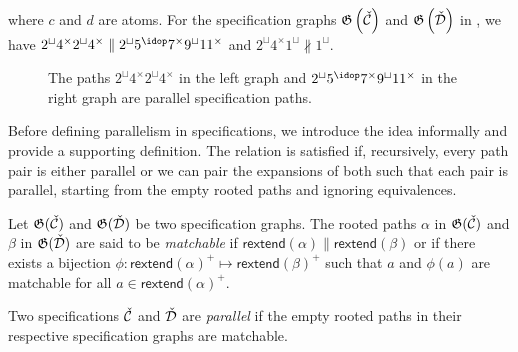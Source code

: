 where $c$ and $d$ are atoms. For the specification graphs $\mathfrak{G}\left(\check{\mathcal{C}}\right)$ and $\mathfrak{G}\left(\check{\mathcal{D}}\right)$ in , we have $2^\sqcup4^\times2^\sqcup4^\times \parallel 2^\sqcup5^{\idop}7^\times9^\sqcup11^\times$ and $2^\sqcup4^\times1^\sqcup \nparallel 1^\sqcup$.
\begin{figure}[ht!]
    \centering
    
    \caption{The paths $2^\sqcup4^\times2^\sqcup4^\times$ in the left graph and $2^\sqcup5^{\idop}7^\times9^\sqcup11^\times$ in the right graph are parallel specification paths.}
    \label{fig:para_path}
\end{figure}

Before defining parallelism in specifications, we introduce the idea informally and provide a supporting definition. The relation is satisfied if, recursively, every path pair is either parallel or we can pair the expansions of both such that each pair is parallel, starting from the empty rooted paths and ignoring equivalences.

Let $\mathfrak{G}(\check{\mathcal{C}})$ and $\mathfrak{G}(\check{\mathcal{D}})$ be two specification graphs. The rooted paths $\alpha$ in $\mathfrak{G}(\check{\mathcal{C}})$ and $\beta$ in $\mathfrak{G}(\check{\mathcal{D}})$ are said to be \emph{matchable} if $\textsf{rextend}(\alpha) \parallel \textsf{rextend}(\beta)$ or if there exists a bijection $\phi: \textsf{rextend}(\alpha)^+ \mapsto \textsf{rextend}(\beta)^+$ such that $a$ and $\phi(a)$ are matchable for all $a\in \textsf{rextend}(\alpha)^+$.

\begin{definition}\label{def:parspec}
Two specifications $\check{\mathcal{C}}$ and $\check{\mathcal{D}}$ are \emph{parallel} if the empty rooted paths in their respective specification graphs are matchable.
\end{definition}

